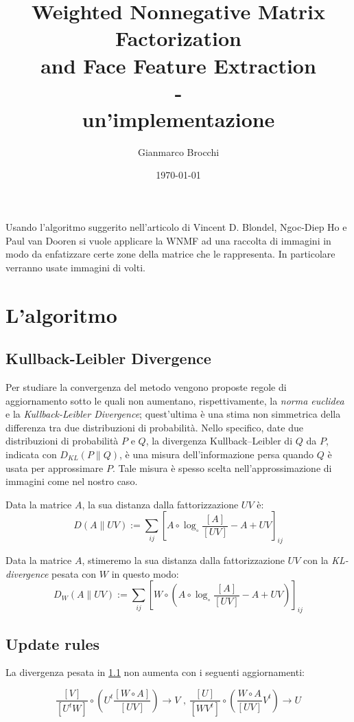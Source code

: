 \documentclass[a4paper]{article} %
\author{Gianmarco Brocchi}
\title{Weighted Nonnegative Matrix Factorization \\
and Face Feature Extraction \\ - \\ un'implementazione}
\date{\today}
\begin{document}
\maketitle

Usando l'algoritmo suggerito nell'articolo di Vincent D. Blondel, Ngoc-Diep Ho e  Paul van Dooren si vuole applicare la WNMF ad una raccolta di immagini in modo da enfatizzare certe zone della matrice che le rappresenta. In particolare verranno usate immagini di volti.

\section{L'algoritmo}

\subsection{Kullback-Leibler Divergence}\label{KL-div}
Per studiare la convergenza del metodo vengono proposte regole di aggiornamento sotto le quali non aumentano, rispettivamente, la \emph{norma euclidea} e la \emph{Kullback-Leibler Divergence}; quest'ultima è una stima non simmetrica della differenza tra due distribuzioni di probabilità. Nello specifico, date due distribuzioni di probabilità $P$ e $Q$, la divergenza Kullback–Leibler di $Q$ da $P$, indicata con $D_{KL}(P \lVert Q)$, è una misura dell'informazione persa quando $Q$ è usata per approssimare $P$. Tale misura è spesso scelta nell'approssimazione di immagini come nel nostro caso.

Data la matrice $A$, la sua distanza dalla fattorizzazione $UV$ è:
\[ D(A \lVert UV) := \sum_{ij} \left[ A \circ \log_{\circ} \frac{[A]}{[UV]} - A + UV \right]_{ij} \]

Data la matrice $A$, stimeremo la sua distanza dalla fattorizzazione $UV$ con la \emph{KL-divergence} pesata con $W$ in questo modo:
\[ D_W(A \lVert UV) := \sum_{ij} \left[ W \circ \left( A \circ \log_{\circ} \frac{[A]}{[UV]} - A + UV \right) \right]_{ij} \]

\subsection{Update rules}\label{updaterules}
La divergenza pesata in \ref{KL-div} non aumenta con i seguenti aggiornamenti:

\[ \frac{[V]}{[U^tW]} \circ \left( U^t \frac{[W \circ A]}{[UV]} \right) \rightarrow V \text{ , } \frac{[U]}{[WV^t]} \circ \left( \frac{W \circ A}{[UV]}V^t \right) \rightarrow U \]
\end{document}
